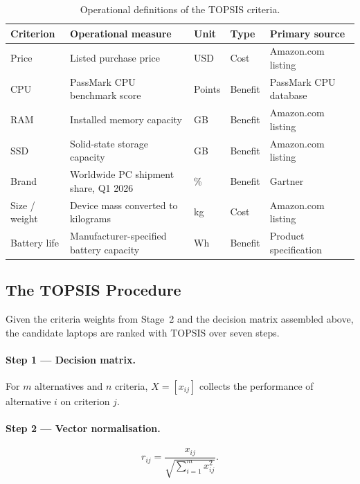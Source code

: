 \begin{table}[htbp]
  \centering
  \caption{Operational definitions of the TOPSIS criteria.}
  \label{tab:operationalisation}
  \begin{tabularx}{\textwidth}{@{}L{2.5cm}L{3.2cm}L{1.5cm}L{1.3cm}Y@{}}
    \toprule
    \textbf{Criterion} & \textbf{Operational measure} & \textbf{Unit} & \textbf{Type} & \textbf{Primary source} \\
    \midrule
    Price & Listed purchase price & USD & Cost & Amazon.com listing \\
    CPU & PassMark CPU benchmark score & Points & Benefit & PassMark CPU database \\
    RAM & Installed memory capacity & GB & Benefit & Amazon.com listing \\
    SSD & Solid-state storage capacity & GB & Benefit & Amazon.com listing \\
    Brand & Worldwide PC shipment share, Q1 2026 & \% & Benefit & Gartner \parencite{gartner_2026} \\
    Size / weight & Device mass converted to kilograms & kg & Cost & Amazon.com listing \\
    Battery life & Manufacturer-specified battery capacity & Wh & Benefit & Product specification \\
    \bottomrule
  \end{tabularx}
\end{table}

\subsection{The TOPSIS Procedure}\label{subsec:topsis-procedure}

Given the criteria weights from Stage~2 and the decision matrix assembled above, the
candidate laptops are ranked with TOPSIS over seven steps.

\paragraph{Step 1 --- Decision matrix.}
For $m$ alternatives and $n$ criteria, $X = [x_{ij}]$ collects the performance of
alternative $i$ on criterion $j$.

\paragraph{Step 2 --- Vector normalisation.}
\begin{equation}\label{eq:norm}
  r_{ij} = \frac{x_{ij}}{\sqrt{\sum_{i=1}^{m} x_{ij}^{2}}}.
\end{equation}

